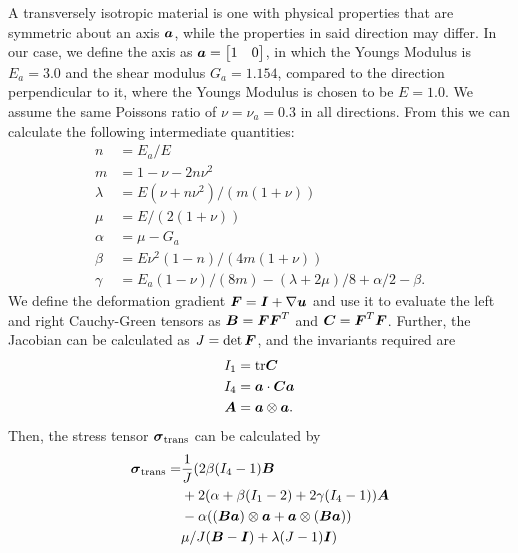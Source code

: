 A transversely isotropic material is one with physical properties that are symmetric about an axis $\boldsymbol{a}$, while the properties in said direction may differ. In our case, we define the axis as $\boldsymbol{a} = \begin{bmatrix}
    1 & 0
\end{bmatrix}$, in which the Youngs Modulus is $E_a = 3.0$ and the shear modulus $G_a = 1.154$, compared to the direction perpendicular to it, where the Youngs Modulus is chosen to be $E = 1.0$. We assume the same Poissons ratio of $\nu = \nu_a = 0.3$ in all directions. From this we can calculate the following intermediate quantities:
\begin{align}
    n &= E_a / E \\
    m &= 1 - \nu - 2  n  \nu^2 \\
    \lambda &= E  ( \nu + n  \nu^2 ) / ( m  ( 1 + \nu ) ) \\
    \mu &= E / ( 2  ( 1 + \nu ) ) \\
    \alpha &= \mu - G_a \\
    \beta &= E  \nu^2  (1-n) / (4m(1+ \nu)) \\
    \gamma &= E_a  (1- \nu) / (8m) - (\lambda + 2  \mu) / 8 + \alpha / 2 - \beta.
\end{align}
We define the deformation gradient $\boldsymbol{F} = \boldsymbol{I} + \nabla \boldsymbol{u}$ and use it to evaluate the left and right Cauchy-Green tensors as $\boldsymbol{B} = \boldsymbol{F} \boldsymbol{F}^T$ and $\boldsymbol{C} = \boldsymbol{F}^T \boldsymbol{F}$. Further, the Jacobian can be calculated as $J = \det \boldsymbol{F}$, and the invariants required are
\begin{align}
    I_1 &= \mathrm{tr} \boldsymbol{C} \\
    I_4 &= \boldsymbol{a} \cdot \boldsymbol{C} \boldsymbol{a} \\
    \boldsymbol{A} &= \boldsymbol{a} \otimes \boldsymbol{a}.
\end{align}
Then, the stress tensor $\boldsymbol{\sigma}_\mathrm{trans}$ can be calculated by
\begin{align*}
    \boldsymbol{\sigma}_\mathrm{trans} = &\frac{1}{J} ( 2\beta(I_4 - 1)  \boldsymbol{B} \\
    & + 2  (\alpha + \beta  (I_1-2) + 2\gamma(I_4-1))  \boldsymbol{A} \\
    & - \alpha  ((\boldsymbol{B} \boldsymbol{a})\otimes \boldsymbol{a} + \boldsymbol{a} \otimes (\boldsymbol{B} \boldsymbol{a})) \\
    & \mu/J  (\boldsymbol{B} - \boldsymbol{I}) + \lambda  (J-1)  \boldsymbol{I})
\end{align*}